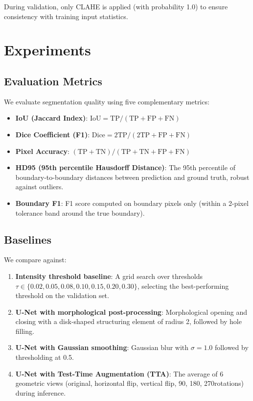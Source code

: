 \documentclass[journal]{IEEEtran}
\begin{document}
During validation, only CLAHE is applied (with probability 1.0) to ensure consistency with training input statistics.

\section{Experiments}
\label{sec:experiments}

\subsection{Evaluation Metrics}

We evaluate segmentation quality using five complementary metrics:
\begin{itemize}
    \item \textbf{IoU (Jaccard Index)}: $\text{IoU} = \text{TP} / (\text{TP} + \text{FP} + \text{FN})$
    \item \textbf{Dice Coefficient (F1)}: $\text{Dice} = 2\text{TP} / (2\text{TP} + \text{FP} + \text{FN})$
    \item \textbf{Pixel Accuracy}: $(\text{TP} + \text{TN}) / (\text{TP} + \text{TN} + \text{FP} + \text{FN})$
    \item \textbf{HD95 (95th percentile Hausdorff Distance)}: The 95th percentile of boundary-to-boundary distances between prediction and ground truth, robust against outliers.
    \item \textbf{Boundary F1}: F1 score computed on boundary pixels only (within a 2-pixel tolerance band around the true boundary).
\end{itemize}

\subsection{Baselines}

We compare against:
\begin{enumerate}
    \item \textbf{Intensity threshold baseline}: A grid search over thresholds $\tau \in \{0.02, 0.05, 0.08, 0.10, 0.15, 0.20, 0.30\}$, selecting the best-performing threshold on the validation set.
    \item \textbf{U-Net with morphological post-processing}: Morphological opening and closing with a disk-shaped structuring element of radius 2, followed by hole filling.
    \item \textbf{U-Net with Gaussian smoothing}: Gaussian blur with $\sigma = 1.0$ followed by thresholding at 0.5.
    \item \textbf{U-Net with Test-Time Augmentation (TTA)}: The average of 6 geometric views (original, horizontal flip, vertical flip, 90\textdegree, 180\textdegree, 270\textdegree rotations) during inference.
\end{enumerate}
\end{document}
